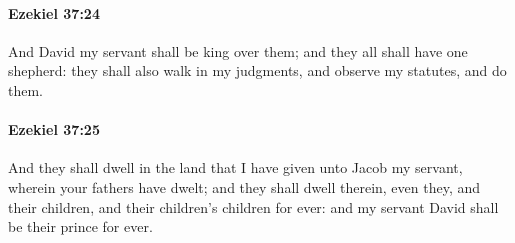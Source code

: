 		\paragraph{Ezekiel 37:24} %
			\label{EZEKIEL-37-24}

			And David my servant shall be king over them; and they all shall have one shepherd: they shall also walk in my judgments, and observe my statutes, and do them.


		\paragraph{Ezekiel 37:25} %
			\label{EZEKIEL-37-25}

			And they shall dwell in the land that I have given unto Jacob my servant, wherein your fathers have dwelt; and they shall dwell therein, even they, and their children, and their children’s children for ever: and my servant David shall be their prince for ever.

